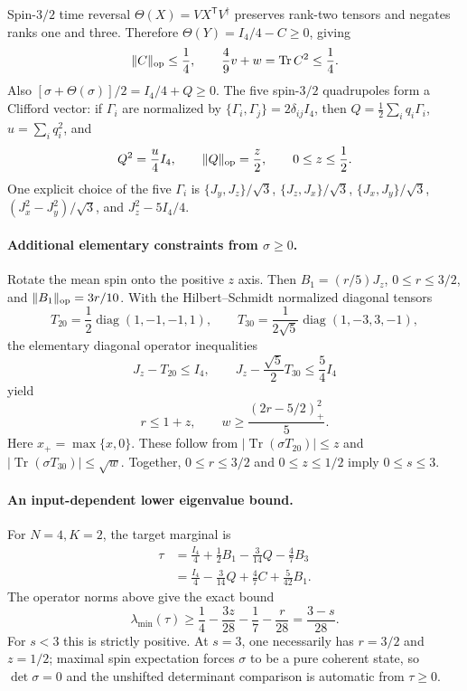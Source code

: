 \documentclass[11pt,a4paper]{article}
\begin{document}
Spin-$3/2$ time reversal $\Theta(X)=VX^{\mathsf T}V^\dagger$ preserves
rank-two tensors and negates ranks one and three. Therefore
$\Theta(Y)=I_4/4-C\ge0$, giving
\begin{equation}\label{t3:eq:C-constraint}
 \|C\|_{\rm op}\le\frac14,\qquad
 \frac49v+w=\operatorname{Tr}C^2\le\frac14.
\end{equation}
Also $[\sigma+\Theta(\sigma)]/2=I_4/4+Q\ge0$.
The five spin-$3/2$ quadrupoles form a Clifford vector: if $\Gamma_i$ are
normalized by $\{\Gamma_i,\Gamma_j\}=2\delta_{ij}I_4$, then
$Q=\frac12\sum_i q_i\Gamma_i$, $u=\sum_iq_i^2$, and
\[
 Q^2=\frac u4I_4,\qquad\|Q\|_{\rm op}=\frac z2,\qquad0\le z\le\frac12.
\]
One explicit choice of the five $\Gamma_i$ is
$\{J_y,J_z\}/\sqrt3$, $\{J_z,J_x\}/\sqrt3$,
$\{J_x,J_y\}/\sqrt3$, $(J_x^2-J_y^2)/\sqrt3$, and
$J_z^2-5I_4/4$.

\paragraph{Additional elementary constraints from $\sigma\ge0$.}
Rotate the mean spin onto the positive $z$ axis. Then $B_1=(r/5)J_z$,
$0\le r\le3/2$, and $\|B_1\|_{\rm op}=3r/10$.
With the Hilbert--Schmidt normalized diagonal tensors
\[
 T_{20}=\frac12\operatorname{diag}(1,-1,-1,1),\qquad
 T_{30}=\frac1{2\sqrt5}\operatorname{diag}(1,-3,3,-1),
\]
the elementary diagonal operator inequalities
\[
 J_z-T_{20}\le I_4,\qquad
 J_z-\frac{\sqrt5}{2}T_{30}\le\frac54I_4
\]
yield
\begin{equation}\label{t3:eq:rz-constraints}
 r\le1+z,\qquad
 w\ge\frac{(2r-5/2)_+^2}{5}.
\end{equation}
Here $x_+=\max\{x,0\}$. These follow from
$|\operatorname{Tr}(\sigma T_{20})|\le z$ and
$|\operatorname{Tr}(\sigma T_{30})|\le\sqrt w$.
Together, $0\le r\le3/2$ and $0\le z\le1/2$ imply $0\le s\le3$.


\paragraph{An input-dependent lower eigenvalue bound.}
For $N=4,K=2$, the target marginal is
\begin{align*}
 \tau&=\frac{I_4}{4}+\frac12B_1-\frac3{14}Q-\frac47B_3\\
 &=\frac{I_4}{4}-\frac3{14}Q+\frac47C+\frac5{42}B_1.
\end{align*}
The operator norms above give the exact bound
\begin{equation}\label{t3:eq:K42-output-floor}
 \lambda_{\min}(\tau)
 \ge\frac14-\frac{3z}{28}-\frac17-\frac r{28}
 =\frac{3-s}{28}.
\end{equation}
For $s<3$ this is strictly positive. At $s=3$, one necessarily has
$r=3/2$ and $z=1/2$; maximal spin expectation forces $\sigma$ to be a
pure coherent state, so $\det\sigma=0$ and the unshifted determinant
comparison is automatic from $\tau\ge0$.
\end{document}

